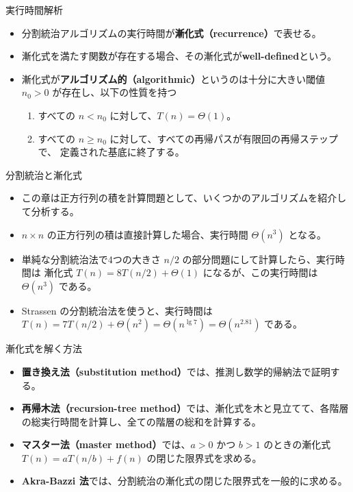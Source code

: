 \documentclass[unicode,11pt,aspectratio=169,notes]{beamer} %
\begin{document}
\begin{frame}{実行時間解析}
  \begin{itemize}
    \item 分割統治アルゴリズムの実行時間が\textbf{漸化式（recurrence）}で表せる。
    \item 漸化式を満たす関数が存在する場合、その漸化式が\textbf{well-defined}という。
    \item 漸化式が\textbf{アルゴリズム的（algorithmic）}というのは十分に大きい閾値
    $n_0>0$ が存在し、以下の性質を持つ
    \begin{enumerate}
      \item すべての $n<n_0$ に対して、$T(n)=\Theta(1)$。
      \item すべての $n\geq n_0$ に対して、すべての再帰パスが有限回の再帰ステップで、
      定義された基底に終了する。
    \end{enumerate}
  \end{itemize}
\end{frame}


\begin{frame}{分割統治と漸化式}
  \begin{itemize}
  \item この章は正方行列の積を計算問題として、いくつかのアルゴリズムを紹介して分析する。
  \item $n\times n$ の正方行列の積は直接計算した場合、実行時間 $\Theta(n^3)$ となる。
  \item 単純な分割統治法で4つの大きさ $n/2$ の部分問題にして計算したら、実行時間は
  漸化式 $T(n) = 8T(n/2) + \Theta(1)$ になるが、この実行時間は $\Theta(n^3)$ である。
  \item Strassen の分割統治法を使うと、実行時間は
  $T(n) = 7T(n/2) + \Theta(n^2) = \Theta(n^{\lg 7}) = \Theta(n^{2.81})$ である。
  \end{itemize}
\end{frame}


\begin{frame}{漸化式を解く方法}
  \begin{itemize}
    \item \textbf{置き換え法（substitution method）}では、推測し数学的帰納法で証明する。
    \item \textbf{再帰木法（recursion-tree method）}では、漸化式を木と見立てて、各階層
    の総実行時間を計算し、全ての階層の総和を計算する。
    \item \textbf{マスター法（master method）}では、$a>0$ かつ $b>1$ のときの漸化式
    $T(n) = aT(n/b)+f(n)$ の閉じた限界式を求める。
    \item \textbf{Akra-Bazzi 法}では、分割統治の漸化式の閉じた限界式を一般的に求める。
  \end{itemize}
\end{frame}
\end{document}
